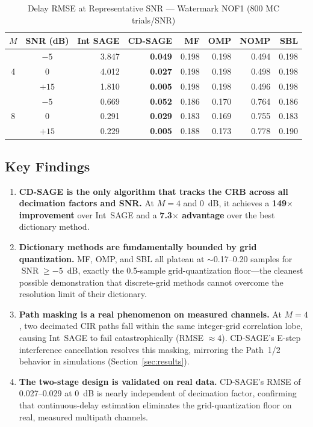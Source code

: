 \documentclass[journal]{IEEEtran}
\DeclareMathOperator{\SNR}{SNR}
\begin{document}
\begin{table}[t]
\centering
\caption{Delay RMSE at Representative SNR --- Watermark NOF1 (800 MC trials/SNR)}
\label{tab:wm}
\footnotesize
\begin{tabular}{@{}ccrrrrrr@{}}
\toprule
$M$ & SNR (dB) & Int SAGE & \textbf{CD-SAGE} & MF & OMP & NOMP & SBL \\
\midrule
\multirow{3}{*}{4} & $-5$  & 3.847 & \textbf{0.049} & 0.198 & 0.198 & 0.494 & 0.198 \\
                    & $0$   & 4.012 & \textbf{0.027} & 0.198 & 0.198 & 0.498 & 0.198 \\
                    & $+15$ & 1.810 & \textbf{0.005} & 0.198 & 0.198 & 0.496 & 0.198 \\
\midrule
\multirow{3}{*}{8} & $-5$  & 0.669 & \textbf{0.052} & 0.186 & 0.170 & 0.764 & 0.186 \\
                    & $0$   & 0.291 & \textbf{0.029} & 0.183 & 0.169 & 0.755 & 0.183 \\
                    & $+15$ & 0.229 & \textbf{0.005} & 0.188 & 0.173 & 0.778 & 0.190 \\
\bottomrule
\end{tabular}
\end{table}

\subsection{Key Findings}

\begin{enumerate}
\item \textbf{CD-SAGE is the only algorithm that tracks the CRB across all decimation factors and SNR.} At $M=4$ and \SI{0}{dB}, it achieves a \textbf{149$\times$ improvement} over Int~SAGE and a \textbf{7.3$\times$ advantage} over the best dictionary method.
\item \textbf{Dictionary methods are fundamentally bounded by grid quantization.} MF, OMP, and SBL all plateau at $\sim$0.17--0.20 samples for $\SNR \ge -5$~dB, exactly the 0.5-sample grid-quantization floor---the cleanest possible demonstration that discrete-grid methods cannot overcome the resolution limit of their dictionary.
\item \textbf{Path masking is a real phenomenon on measured channels.} At $M=4$, two decimated CIR paths fall within the same integer-grid correlation lobe, causing Int~SAGE to fail catastrophically (RMSE $\approx 4$). CD-SAGE's E-step interference cancellation resolves this masking, mirroring the Path~1/2 behavior in simulations (Section~\ref{sec:results}).
\item \textbf{The two-stage design is validated on real data.} CD-SAGE's RMSE of 0.027--0.029 at \SI{0}{dB} is nearly independent of decimation factor, confirming that continuous-delay estimation eliminates the grid-quantization floor on real, measured multipath channels.
\end{enumerate}
\end{document}
